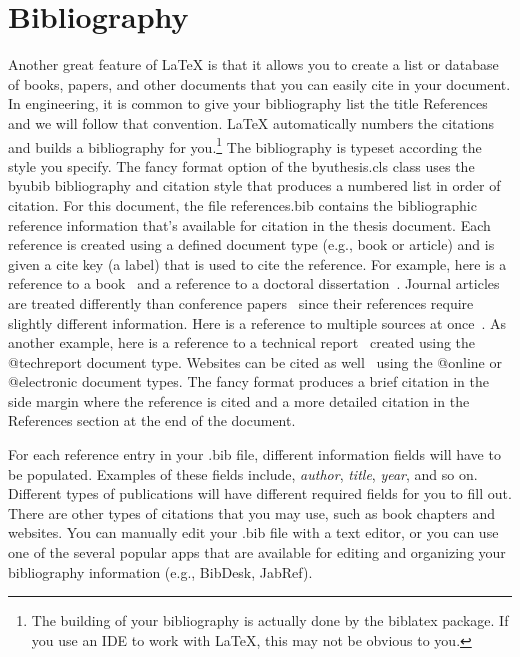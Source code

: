 \section{Bibliography}
Another great feature of \LaTeX{} is that it allows you to create a list or database of books, papers, and other documents that you can easily cite in your document. In engineering, it is common to give your bibliography list the title References and we will follow that convention. \LaTeX{} automatically numbers the citations and builds a bibliography for you.\footnote{The building of your bibliography is actually done by the {\ttfamily biblatex} package. If you use an IDE to work with \LaTeX, this may not be obvious to you.} The bibliography is typeset according the style you specify. The fancy format option of the {\ttfamily byuthesis.cls} class uses the {\ttfamily byubib} bibliography and citation style that produces a numbered list in order of citation. For this document, the file {\ttfamily references.bib} contains the bibliographic reference information that's available for citation in the thesis document. Each reference is created using a defined document type (e.g., {\ttfamily book} or {\ttfamily article}) and is given a cite key (a label) that is used to cite the reference. For example, here is a reference to a book~ and a reference to a doctoral dissertation~. Journal articles~ are treated differently than conference papers~ since their references require slightly different information. Here is a reference to multiple sources at once~. As another example, here is a reference to a technical report~ created using the {\ttfamily @techreport} document type.  Websites can be cited as well~ using the {\ttfamily @online} or {\ttfamily @electronic} document types. The fancy format produces a brief citation in the side margin where the reference is cited and a more detailed citation in the References section at the end of the document.

For each reference entry in your {\ttfamily .bib} file, different information fields will have to be populated. Examples of these fields include, {\em author}, {\em title}, {\em year}, and so on. Different types of publications will have different required fields for you to fill out. There are other types of citations that you may use, such as book chapters and websites. You can manually edit your {\ttfamily .bib} file with a text editor, or you can use one of the several popular apps that are available for editing and organizing your bibliography information (e.g., BibDesk, JabRef).

